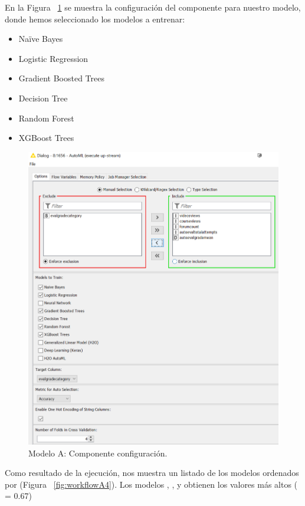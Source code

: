 En la Figura ~\ref{fig:workflowA2} se muestra la configuración del componente  para nuestro modelo, donde hemos seleccionado los 
modelos a entrenar: 

\begin{itemize}
	\item Naïve Bayes
	\item Logistic Regression
	\item Gradient Boosted Trees 
	\item Decision Tree 
	\item Random Forest 
	\item XGBoost Trees
\end{itemize}

\begin{figure}[!htb]
	\centering
	\includegraphics[width=1\textwidth]{img/workflowA2.png}
	\caption{Modelo A: Componente  configuración.}
	\label{fig:workflowA2}
\end{figure}
\FloatBarrier

Como resultado de la ejecución,  nos muestra un listado de los modelos ordenados por  (Figura ~\ref{fig:workflowA4}). 
Los modelos , ,  y  obtienen los valores más altos ( = 0.67)

